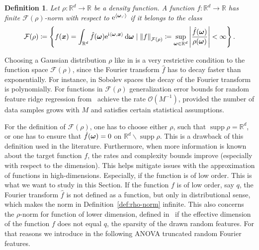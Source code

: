 \documentclass{article}
\renewcommand{\vec}[1]{\ensuremath \mathbf{\boldsymbol{#1}}}
\newcommand{\w}{\ensuremath{\vec \omega}}
\newcommand{\x}{\ensuremath{\vec x}}
\newcommand{\F}{\ensuremath{\mathcal{F}}}
\newcommand{\R}{\ensuremath{\mathbb{R}}}
\renewcommand{\O}{\ensuremath{\mathcal{O}}}
\newcommand{\e}{\mathrm{e}}
\newcommand{\im}{\mathrm{i}}
\DeclareMathOperator*{\supp}{supp}
\renewcommand{\d}{\, \mathrm{d}}
\newcommand{\norm}[1]{\left\lVert {#1} \right\rVert}    %
\theoremstyle{definition}
\newtheorem{definition}[theorem]{Definition}
\newenvironment{Definition}{ \begin{definition}\normalfont\slshape}{\end{definition}}
\numberwithin{equation}{section}
\begin{document}
\begin{Definition}\label{def:rho-norm}
Let $\rho\colon\R^d\rightarrow \R$ be a density function. A function $f\colon \R^d\rightarrow \R$ has finite $\F(\rho)$-norm with respect to $\e^{\langle \w, \cdot\rangle}$ if it belongs to the class
\begin{equation}\label{eq:F_rho_old}
\F(\rho) \coloneqq \left\{f(\vec x) = \int_{\R^d} \hat{f}(\w) \e^{\im \langle \w, \x\rangle}\d \w\mid  \norm{f}_{\F(\rho)}\coloneqq \sup_{\w\in \R^d} \left\lvert \frac{\hat{f}(\w)}{\rho(\w)}\right\rvert <\infty\right\}.
\end{equation}
\end{Definition}
Choosing a Gaussian distribution $\rho$ like in \cite{Xie22,Ha23} is a very restrictive condition to the function space $\F(\rho)$, since the Fourier transform $\hat f$ has to decay faster than exponentially. For instance, in Sobolev spaces the decay of the Fourier transform is polynomially.
For functions in $\F(\rho)$ generalization error bounds for random feature ridge
regression from~\cite{Xie22,Ha23} achieve the rate $\O(M^{-1})$, provided the number of data samples grows with $M$ and satisfies certain statistical assumptions.\par

For the definition of $\F(\rho)$, one has to choose either $\rho$, such that $\supp \rho = \R^d$, or one has to ensure that $\hat f(\w) = 0$ on $\R^d\backslash \supp \rho$. This is a drawback of this definition used in the literature. Furthermore, when more information is known about the target function $f$, the rates and complexity
bounds improve (especially with respect to the dimension). This helps mitigate issues
with the approximation of functions in high-dimensions. Especially, if the function is of low order. This is what we want to study in this Section. 
If the function $f$ is of low order, say $q$, the Fourier transform $\hat f$ is not defined as a function, 
but only in distributional sense, which makes the norm in Definition~\ref{def:rho-norm} infinite. This also concerns the $\rho$-norm for function of lower dimension, defined in~\cite{Ha23} if the effective dimension of the function $f$ does not equal $q$, the sparsity of the drawn random features.
For that reasons we introduce in the following ANOVA truncated random Fourier features.
\end{document}
